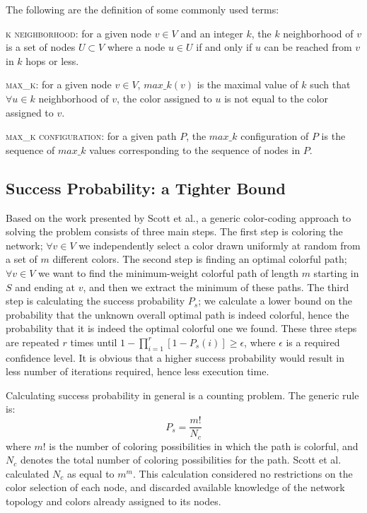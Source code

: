 \documentclass{ws-procs11x85}
\begin{document}
The following are the definition of some commonly used terms:
\begin{arabiclist}[3]
\item {\scshape k neighborhood}: for a given node $v \in V$ and an integer $k$,
the $k$ neighborhood of $v$ is a set of nodes  $U \subset V$ where a node $u \in
U$ if and only if $u$ can be reached from $v$ in $k$ hops or less.
\item {\scshape max\_k}: for a given node $v \in V$, $max\_k(v)$ is the maximal
value of $k$ such that $\forall u \in k$ neighborhood of $v$, the color assigned
to $u$ is not equal to the color assigned to $v$.
\item {\scshape max\_k configuration}: for a given path $P$, the $max\_k$
configuration of $P$ is the sequence of $max\_k$ values corresponding to the
sequence of nodes in $P$.
\end{arabiclist}

\subsection{Success Probability: a Tighter Bound}

Based on the work presented by Scott et al.\cite{scott}, a generic color-coding
approach to solving the problem consists of three main steps. The first step is
coloring the network; $\forall v \in V$ we independently select a color drawn
uniformly at random from a set of $m$ different colors. The second step is
finding an optimal colorful path; $\forall v \in V$ we want to find the
minimum-weight colorful path of length $m$ starting in $S$ and ending at $v$,
and then we extract the minimum of these paths. The third step is calculating
the success probability $P_s$; we calculate a lower bound on the probability
that the unknown overall optimal path is indeed colorful, hence the probability
that it is indeed the optimal colorful one we found. These three steps are
repeated $r$ times until $1 - \prod_{i=1}^r [1 - P_s(i)] \geq \epsilon$, where
$\epsilon$ is a required confidence level. It is obvious that a higher success
probability would result in less number of iterations required, hence less
execution time.

Calculating success probability in general is a counting problem. The
generic rule is:
\begin{equation}
P_s = \frac{m!}{N_c}
\label{eqgeneral}
\end{equation} 
where $m!$ is the number of coloring possibilities in which the path is
colorful, and $N_c$ denotes the total number of coloring possibilities for the
path. Scott et al.\cite{scott} calculated $N_c$ as equal to $m^m$. This
calculation considered no restrictions on the color selection of each node, and
discarded available knowledge of the network topology and colors already
assigned to its nodes.
\end{document}
